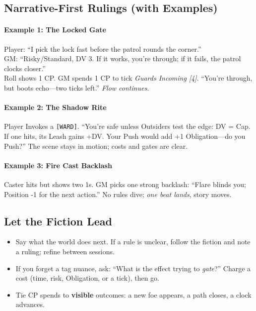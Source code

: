 \subsection{Narrative-First Rulings (with Examples)}
\paragraph{Example 1: The Locked Gate}
Player: ``I pick the lock fast before the patrol rounds the corner.''\\
GM: ``Risky/Standard, DV 3. If it works, you’re through; if it fails, the patrol clocks closer.''\\
Roll shows 1 CP. GM spends 1 CP to tick \emph{Guards Incoming [4]}. ``You’re through, but boots echo—two ticks left.'' \emph{Flow continues.}

\paragraph{Example 2: The Shadow Rite}
Player Invokes a \texttt{[WARD]}. ``You’re safe unless Outsiders test the edge: DV = Cap. If one hits, its Leash gains +DV. Your Push would add +1 Obligation—do you Push?'' The scene stays in motion; costs and gates are clear.

\paragraph{Example 3: Fire Cast Backlash}
Caster hits but shows two 1s. GM picks one strong backlash: ``Flare blinds you; Position -1 for the next action.'' No rules dive; \emph{one beat lands}, story moves.

\subsection{Let the Fiction Lead}
\begin{itemize}
  \item Say what the world does next. If a rule is unclear, follow the fiction and note a ruling; refine between sessions.
  \item If you forget a tag nuance, ask: ``What is the effect trying to \emph{gate}?'' Charge a cost (time, risk, Obligation, or a tick), then go.
  \item Tie CP spends to \textbf{visible} outcomes: a new foe appears, a path closes, a clock advances.
\end{itemize}

